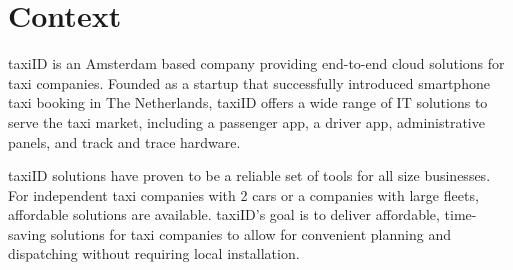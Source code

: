 \documentclass[11pt,conference]{IEEEtran}
\begin{document}


\tableofcontents
\printindex
\newif\ifdraft\drafttrue
















%
\section{Context}
taxiID is an Amsterdam based company providing end-to-end cloud solutions for taxi companies. Founded as a startup that successfully introduced smartphone taxi booking in The Netherlands, taxiID offers a wide range of IT solutions to serve the taxi market, including a passenger app, a driver app, administrative panels, and track and trace hardware.

taxiID solutions have proven to be a reliable set of tools for all size businesses. For independent taxi companies with 2 cars or a companies with large fleets, affordable solutions are available. taxiID's goal is to deliver affordable, time-saving solutions for taxi companies to allow for convenient planning and dispatching without requiring local installation.
\end{document}
